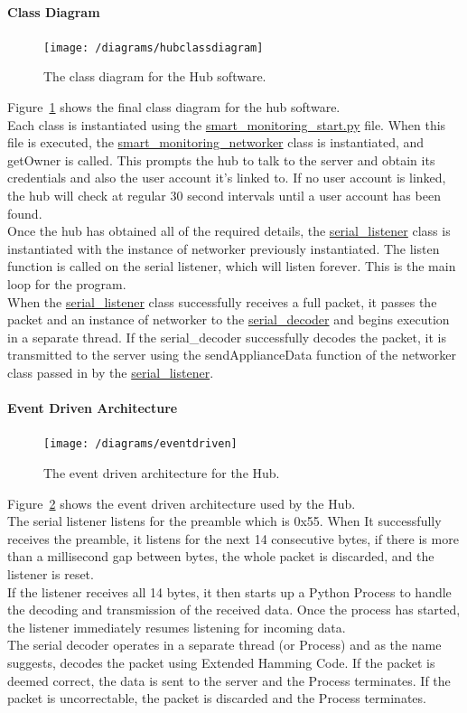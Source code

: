 \documentclass[draft,preprint,12pt,3p]{elsarticle}
\begin{document}
\paragraph{Class Diagram}
\begin{figure}[H]
    \centering
    \texttt{[image: /diagrams/hubclassdiagram]}
    \caption{The class diagram for the Hub software.}
    \label{fig:hubclassdiagram}
\end{figure}
Figure~\ref{fig:hubclassdiagram} shows the final class diagram for the hub software.\\
Each class is instantiated using the \underline{smart\_monitoring\_start.py} file. When this file is executed, the \underline{smart\_monitoring\_networker} class is instantiated, and getOwner is called. This prompts the hub to talk to the server and obtain its credentials and also the user account it's linked to. If no user account is linked, the hub will check at regular 30 second intervals until a user account has been found.\\
Once the hub has obtained all of the required details, the \underline{serial\_listener} class is instantiated with the instance of networker previously instantiated. The listen function is called on the serial listener, which will listen forever. This is the main loop for the program.\\
When the \underline{serial\_listener} class successfully receives a full packet, it passes the packet and an instance of networker to the \underline{serial\_decoder} and begins execution in a separate thread. If the serial\_decoder successfully decodes the packet, it is transmitted to the server using the sendApplianceData function of the networker class passed in by the \underline{serial\_listener}.
\paragraph{Event Driven Architecture}

\begin{figure}[H]
    \centering
    \texttt{[image: /diagrams/eventdriven]}
    \caption{The event driven architecture for the Hub.}
    \label{fig:eventdriven}
\end{figure}

Figure~\ref{fig:eventdriven} shows the event driven architecture used by the Hub.\\
The serial listener listens for the preamble which is 0x55. When It successfully receives the preamble, it listens for the next 14 consecutive bytes, if there is more than a millisecond gap between bytes, the whole packet is discarded, and the listener is reset.\\
If the listener receives all 14 bytes, it then starts up a Python Process to handle the decoding and transmission of the received data. Once the process has started, the listener immediately resumes listening for incoming data.\\ 
The serial decoder operates in a separate thread (or Process) and as the name suggests, decodes the packet using Extended Hamming Code. If the packet is deemed correct, the data is sent to the server and the Process terminates. If the packet is uncorrectable, the packet is discarded and the Process terminates.
\end{document}
